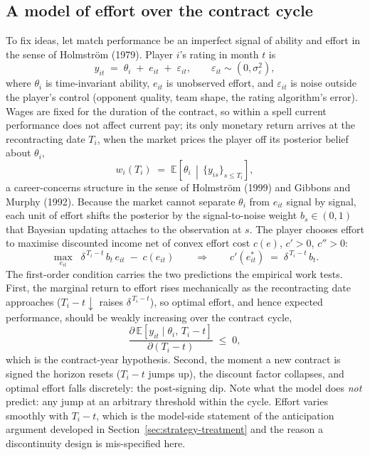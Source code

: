 \documentclass{article}
\begin{document}
\subsection{A model of effort over the contract cycle}
\label{sec:strategy-model}

To fix ideas, let match performance be an imperfect signal of ability and effort
in the sense of Holmstr{\"o}m (1979). Player $i$'s rating in month $t$ is
\[
  y_{it} \;=\; \theta_i \;+\; e_{it} \;+\; \varepsilon_{it},
  \qquad \varepsilon_{it} \sim (0, \sigma^2_\varepsilon),
\]
where $\theta_i$ is time-invariant ability, $e_{it}$ is unobserved effort, and
$\varepsilon_{it}$ is noise outside the player's control (opponent quality,
team shape, the rating algorithm's error). Wages are fixed for the duration of the
contract, so within a spell current performance does not affect current pay;
its only monetary return arrives at the recontracting date $T_i$, when the market
prices the player off its posterior belief about $\theta_i$,
\[
  w_i(T_i) \;=\; \mathbb{E}\!\left[\theta_i \,\middle|\, \{y_{is}\}_{s \le T_i}\right],
\]
a career-concerns structure in the sense of Holmstr{\"o}m (1999) and Gibbons and
Murphy (1992). Because the market cannot separate $\theta_i$ from $e_{it}$ signal
by signal, each unit of effort shifts the posterior by the signal-to-noise weight
$b_s \in (0,1)$ that Bayesian updating attaches to the observation at $s$. The
player chooses effort to maximise discounted income net of convex effort cost
$c(e)$, $c' > 0$, $c'' > 0$:
\[
  \max_{e_{it}} \;\; \delta^{\,T_i - t}\, b_t \, e_{it} \;-\; c(e_{it})
  \qquad\Longrightarrow\qquad
  c'(e^*_{it}) \;=\; \delta^{\,T_i - t}\, b_t .
\]
The first-order condition carries the two predictions the empirical work tests.
First, the marginal return to effort rises mechanically as the recontracting date
approaches ($T_i - t \downarrow$ raises $\delta^{\,T_i - t}$), so optimal effort,
and hence expected performance, should be weakly increasing over the contract
cycle,
\[
  \frac{\partial\, \mathbb{E}[y_{it} \mid \theta_i,\, T_i - t]}{\partial (T_i - t)}
  \;\le\; 0 ,
\]
which is the contract-year hypothesis. Second, the moment a new contract is
signed the horizon resets ($T_i - t$ jumps up), the discount factor collapses,
and optimal effort falls discretely: the post-signing dip. Note what the model
does \emph{not} predict: any jump at an arbitrary threshold within the cycle.
Effort varies smoothly with $T_i - t$, which is the model-side statement of the
anticipation argument developed in Section~\ref{sec:strategy-treatment} and the
reason a discontinuity design is mis-specified here.
\end{document}
